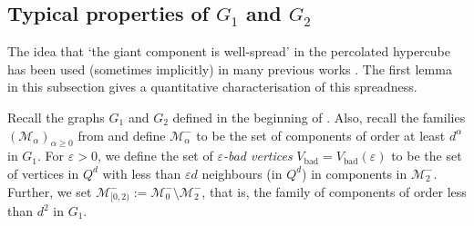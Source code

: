 \documentclass[reqno,final,a4paper]{amsart}
\theoremstyle{definition}
\newcommand{\cM}{\mathcal{M}}
\def\eps{\varepsilon}
\def\vbad{V_{\mathrm{bad}}}
\newcommand{\1}{\mathbbm{1}}
\begin{document}
\subsection{\texorpdfstring{Typical properties of $G_1$ and $G_2$}{Typical properties of G1 and G2}}\label{subsec: typical}
The idea that `the giant component is well-spread' in the percolated hypercube has been used (sometimes implicitly) in many previous works \cite{AKS81,BKL92,DEKK24,EKK22}. The first lemma in this subsection gives a quantitative characterisation of this spreadness.

Recall the graphs $G_1$ and $G_2$ defined in the beginning of . 
Also, recall the families $(\cM_{\alpha})_{\alpha\ge 0}$ from  and define $\cM_{\alpha}^-$ to be the set of components of order at least $d^{\alpha}$ in $G_1$.
For $\eps > 0$, we define the set of \emph{$\eps$-bad vertices} $\vbad = \vbad(\eps)$ to be the set of vertices in $Q^d$ with less than $\eps d$ neighbours (in $Q^d$) in components in $\cM_2^-$.
Further, we set $\cM_{[0,2)}^-:=\cM_0^-\setminus \cM_2^-$, that is, the family of components of order less than $d^2$ in $G_1$.
\end{document}
